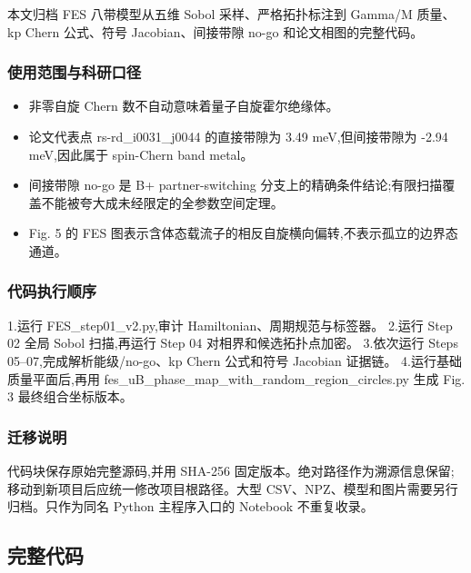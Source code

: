 \documentclass[lang=cn,scheme=chinese,color=blue,device=normal,toc=onecol,math=cm]{elegantbook}
\begin{document}
本文归档 FES 八带模型从五维 Sobol 采样、严格拓扑标注到 Gamma/\allowbreak{}M 质量、kp Chern 公式、符号 Jacobian、间接带隙 no-go 和论文相图的完整代码。\par


\subsubsection{使用范围与科研口径}


\begin{itemize}
\item 非零自旋 Chern 数不自动意味着量子自旋霍尔绝缘体。
\item 论文代表点 rs-rd\_\allowbreak{}i0031\_\allowbreak{}j0044 的直接带隙为 3.49 meV,但间接带隙为 -2.94 meV,因此属于 spin-Chern band metal。
\item 间接带隙 no-go 是 B+ partner-switching 分支上的精确条件结论;有限扫描覆盖不能被夸大成未经限定的全参数空间定理。
\item Fig. 5 的 FES 图表示含体态载流子的相反自旋横向偏转,不表示孤立的边界态通道。
\end{itemize}


\subsubsection{代码执行顺序}


1.运行 FES\_\allowbreak{}step01\_\allowbreak{}v2.py,审计 Hamiltonian、周期规范与标签器。 2.运行 Step 02 全局 Sobol 扫描,再运行 Step 04 对相界和候选拓扑点加密。 3.依次运行 Steps 05–07,完成解析能级/\allowbreak{}no-go、kp Chern 公式和符号 Jacobian 证据链。 4.运行基础质量平面后,再用 fes\_\allowbreak{}uB\_\allowbreak{}phase\_\allowbreak{}map\_\allowbreak{}with\_\allowbreak{}random\_\allowbreak{}region\_\allowbreak{}circles.py 生成 Fig. 3 最终组合坐标版本。\par


\subsubsection{迁移说明}


代码块保存原始完整源码,并用 SHA-256 固定版本。绝对路径作为溯源信息保留;移动到新项目后应统一修改项目根路径。大型 CSV、NPZ、模型和图片需要另行归档。只作为同名 Python 主程序入口的 Notebook 不重复收录。\par


\subsection{完整代码}
\end{document}
